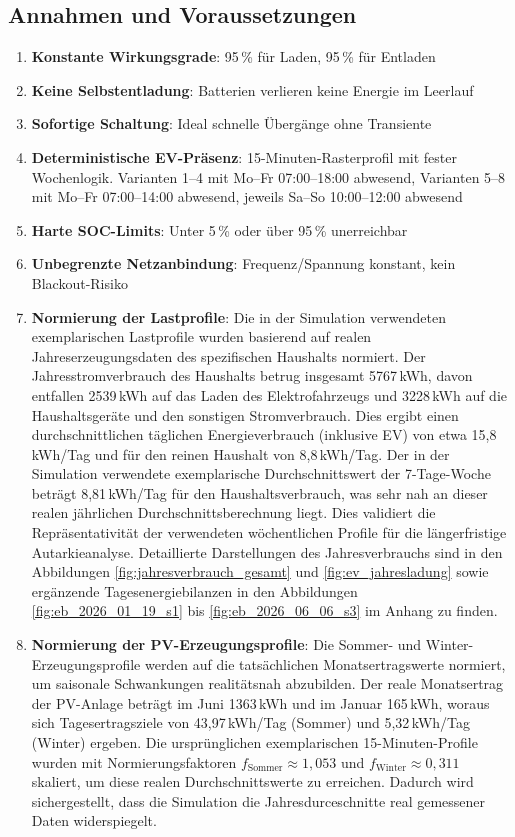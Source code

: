 \documentclass[conference]{IEEEtran}
\begin{document}
\subsection{Annahmen und Voraussetzungen}

\begin{enumerate}
\item \textbf{Konstante Wirkungsgrade}: 95\,\% für Laden, 95\,\% für Entladen
\item \textbf{Keine Selbstentladung}: Batterien verlieren keine Energie im Leerlauf
\item \textbf{Sofortige Schaltung}: Ideal schnelle Übergänge ohne Transiente
\item \textbf{Deterministische EV-Präsenz}: 15-Minuten-Rasterprofil mit fester Wochenlogik. Varianten 1--4 mit Mo--Fr 07:00--18:00 abwesend, Varianten 5--8 mit Mo--Fr 07:00--14:00 abwesend, jeweils Sa--So 10:00--12:00 abwesend
\item \textbf{Harte SOC-Limits}: Unter 5\,\% oder über 95\,\% unerreichbar
\item \textbf{Unbegrenzte Netzanbindung}: Frequenz/Spannung konstant, kein Blackout-Risiko
\item \textbf{Normierung der Lastprofile}: Die in der Simulation verwendeten exemplarischen Lastprofile wurden basierend auf realen Jahreserzeugungsdaten des spezifischen Haushalts normiert. Der Jahresstromverbrauch des Haushalts betrug insgesamt 5767\,kWh, davon entfallen 2539\,kWh auf das Laden des Elektrofahrzeugs und 3228\,kWh auf die Haushaltsgeräte und den sonstigen Stromverbrauch. Dies ergibt einen durchschnittlichen täglichen Energieverbrauch (inklusive EV) von etwa 15,8\,kWh/Tag und für den reinen Haushalt von 8,8\,kWh/Tag. Der in der Simulation verwendete exemplarische Durchschnittswert der 7-Tage-Woche beträgt 8,81\,kWh/Tag für den Haushaltsverbrauch, was sehr nah an dieser realen jährlichen Durchschnittsberechnung liegt. Dies validiert die Repräsentativität der verwendeten wöchentlichen Profile für die längerfristige Autarkieanalyse. Detaillierte Darstellungen des Jahresverbrauchs sind in den Abbildungen \ref{fig:jahresverbrauch_gesamt} und \ref{fig:ev_jahresladung} sowie ergänzende Tagesenergiebilanzen in den Abbildungen \ref{fig:eb_2026_01_19_s1} bis \ref{fig:eb_2026_06_06_s3} im Anhang zu finden.
\item \textbf{Normierung der PV-Erzeugungsprofile}: Die Sommer- und Winter-Erzeugungsprofile werden auf die tatsächlichen Monatsertragswerte normiert, um saisonale Schwankungen realitätsnah abzubilden. Der reale Monatsertrag der PV-Anlage beträgt im Juni 1363\,kWh und im Januar 165\,kWh, woraus sich Tagesertragsziele von 43,97\,kWh/Tag (Sommer) und 5,32\,kWh/Tag (Winter) ergeben. Die ursprünglichen exemplarischen 15-Minuten-Profile wurden mit Normierungsfaktoren $f_{\text{Sommer}} \approx 1{,}053$ und $f_{\text{Winter}} \approx 0{,}311$ skaliert, um diese realen Durchschnittswerte zu erreichen. Dadurch wird sichergestellt, dass die Simulation die Jahresdurceschnitte real gemessener Daten widerspiegelt.
\end{enumerate}
\end{document}
